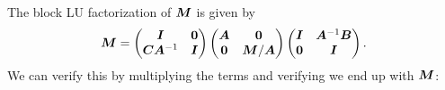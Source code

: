 \documentclass[twoside,10pt]{article}
\begin{document}
  \quad The block LU factorization of $\bm{M}$ is given by 
  \begin{equation}
    \bm{M} = 
    \begin{pmatrix}
      \bm{I} & \bm{0} \\
      \bm{C} \bm{A}^{-1} & \bm{I}
    \end{pmatrix}
    \begin{pmatrix}
      \bm{A} & \bm{0} \\
      \bm{0} & \bm{M} / \bm{A}
    \end{pmatrix}
    \begin{pmatrix}
      \bm{I} & \bm{A}^{-1} \bm{B} \\
      \bm{0} & \bm{I}
    \end{pmatrix}.
  \end{equation}
  \quad We can verify this by multiplying the terms and verifying we end up with $\bm{M}$:
\end{document}
